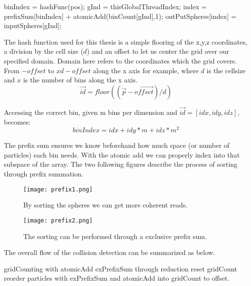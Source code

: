 \begin{algorithm}[H]
  \begin{algorithmic}[1]
  \State binIndex = hashFunc(pos);
  \State gInd = thisGlobalThreadIndex;
  \State index = prefixSum[binIndex] + atomicAdd(binCount[gInd],1);
  \State outPutSpheres[index] = inputSpheres[gInd];
\end{algorithmic}
\end{algorithm}

The hash function used for this thesis is a simple flooring of the x,y,z coordinates, a
division by the cell size ($d$) and an offset to let us center the grid over our specified domain.
Domain here refers to the coordinates which the grid covers. From $-offset$ to $xd-offset$ along the
x axis for example, where $d$ is the cellsize and $x$ is the number of bins along the x axis.
\begin{equation}
  \vec{id} = floor((\vec{p}-\vec{offset})/d)
\end{equation}

Accessing the correct bin, given m bins per dimension and $\vec{id} = [idx,idy,idz]$, becomes:
\begin{equation}
  binIndex = idx + idy*m + idz*m^2
\end{equation}

The prefix sum ensures we know beforehand how much space (or number of particles)
each bin needs. With the atomic add we can properly index into that subspace of the
array. The two following figures describe the process of sorting through prefix summation.

\begin{figure}[H]
  \centering
  \texttt{[image: prefix1.png]}
  \caption{By sorting the spheres we can get more coherent reads.}
\end{figure}

\begin{figure}[H]
  \centering
  \texttt{[image: prefix2.png]}
  \caption{The sorting can be performed through a exclusive prefix sum.}
\end{figure}

The overall flow of the collision detection can be summarized as below.

\begin{algorithm}[H]
  \begin{algorithmic}[1]
  \State gridCounting with atomicAdd
  \State exPrefixSum through reduction
  \State reset gridCount
  \State reorder particles with exPrefixSum and atomicAdd into gridCount to offset.
  \end{algorithmic}
\end{algorithm}


